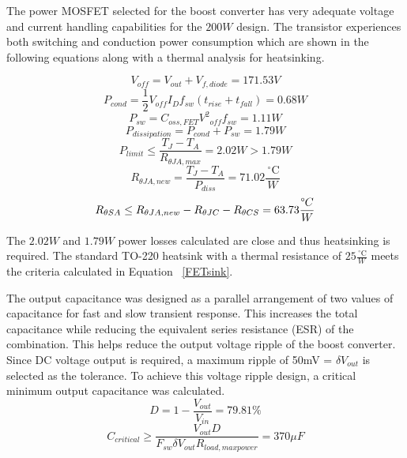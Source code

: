 The power MOSFET selected for the boost converter has very adequate voltage and current handling capabilities for the $200W$ design. The transistor experiences both switching and conduction power consumption which are shown in the following equations along with a thermal analysis for heatsinking.

\begin{equation}
V_{off} = V_{out} + V_{f,diode} = 171.53V
\end{equation} 
\begin{equation}
P_{cond} = \frac{1}{2}V_{off}I_Df_{sw}(t_{rise}+t_{fall}) = 0.68W
\end{equation}
\begin{equation}
P_{sw} = C_{oss,FET}{V^2}_{off}f_{sw} = 1.11W
\end{equation}
\begin{equation}
P_{dissipation} = P_{cond} + P_{sw} = 1.79W
\end{equation}
\begin{equation}
P_{limit} \leq \frac{T_J-T_A}{R_{\theta JA,max}} = 2.02W > 1.79W
\end{equation}
\begin{equation}
R_{\theta JA,new} = \frac{T_J-T_A}{P_{diss}} = 71.02\frac{\,^{\circ}\mathrm{C}}{W}
\end{equation}
\begin{equation}
R_{\theta SA} \leq R_{\theta JA,new} - R_{\theta JC} - R_{\theta CS} = 63.73\frac{\degree{C}}{W}
\label{FETsink}
\end{equation}

The $2.02W $ and $ 1.79W$ power losses calculated are close and thus heatsinking is required. The standard TO-220 heatsink with a thermal resistance of $25\frac{\,^{\circ}\mathrm{C}}{W}$ meets the criteria calculated in Equation ~\ref{FETsink}.

The output capacitance was designed as a parallel arrangement of two values of capacitance for fast and slow transient response. This increases the total capacitance while reducing the equivalent series resistance (ESR) of the combination. This helps reduce the output voltage ripple of the boost converter. Since DC voltage output is required, a maximum ripple of 50mV = $\delta V_{out}$ is selected as the tolerance. To achieve this voltage ripple design, a critical minimum output capacitance was calculated.\cite{hasaneen}
\begin{equation}
D = 1 - \frac{V_{out}}{V_{in}} = 79.81\% 
\end{equation}
\begin{equation}
C_{critical} \ge \frac{V_{out}D}{F_{sw}\delta V_{out}R_{load,maxpower}} = 370 \mu F
\end{equation}

